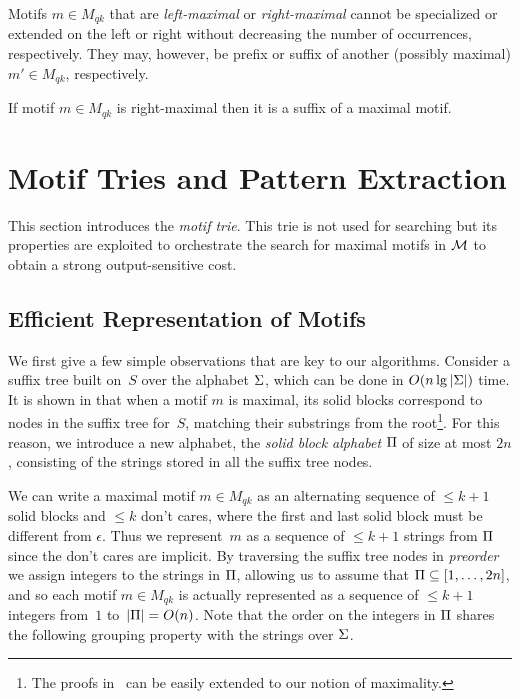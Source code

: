 Motifs $m \in M_{qk}$ that are \emph{left-maximal} or \emph{right-maximal} cannot be specialized or extended on the left or right without decreasing the number of occurrences, respectively. They may, however, be prefix or suffix of another (possibly maximal) $m' \in M_{qk}$, respectively. 

\begin{fact}
  \label{fact:right-maximal-suffix}
  If motif $m \in M_{qk}$ is right-maximal then it is a suffix of a maximal motif.
\end{fact}



\section{Motif Tries and Pattern Extraction}
\label{sec:motif_trie}
%
This section introduces the \emph{motif trie}. This trie is not used for searching but its properties are exploited to orchestrate the search for maximal motifs in $\mathcal{M}$ to obtain a strong output-sensitive cost. %

\subsection{Efficient Representation of Motifs}
\label{sub:efficient-representatin-motifs}
%
We first give a few simple observations that are key to our algorithms. Consider a suffix tree built on~$S$ over the alphabet $\Sigma$, which can be done in $O(n \lg |\Sigma|)$ time. 
It is shown in \cite{tcsUkkonen09,tcsFP09} that when a motif $m$ is maximal, its solid blocks correspond to nodes in the suffix tree for~$S$, matching their substrings from the root\footnote{The proofs in~\cite{tcsUkkonen09,tcsFP09} can be easily extended to our notion of maximality.}.
For this reason, we introduce a new alphabet, the \emph{solid block alphabet} $\Pi$ of size at most $2n$, consisting of the strings stored in all the suffix tree nodes. 

We can write a maximal motif $m \in M_{qk}$ as an alternating sequence of $\leq k+1$ solid blocks and $\leq k$ don't cares, where the first and last solid block must be different from $\epsilon$. Thus we represent~$m$ as a sequence of $\leq k+1$ strings from $\Pi$ since the don't cares are implicit.
By traversing the suffix tree nodes in \emph{preorder} we assign integers to the strings in $\Pi$, allowing us to assume that $\Pi \subseteq [1, \ldots, 2n]$, and so each motif $m \in M_{qk}$ is actually represented as a sequence of $\leq k+1$ integers from~$1$ to~$|\Pi| =O(n)$. Note that the order on the integers in $\Pi$ shares the following grouping property with the strings over $\Sigma$.

